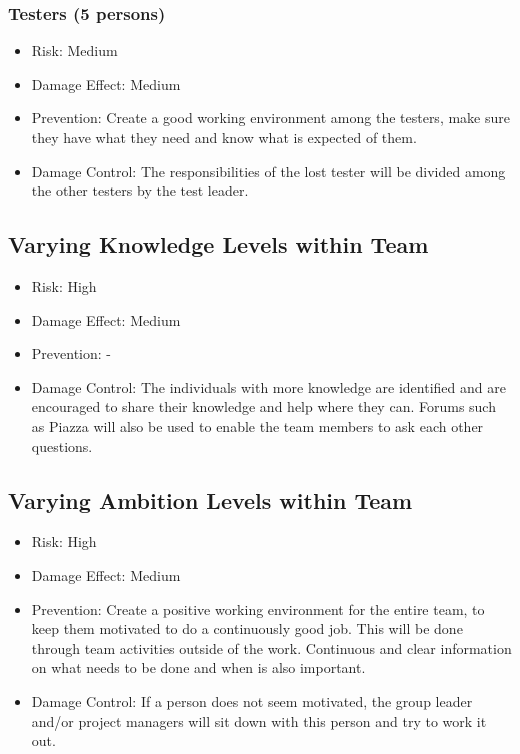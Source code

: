\documentclass[a4paper]{article}
\begin{document}
\subsubsection{Testers (5 persons)}
\begin{itemize}
\item Risk: Medium
\item Damage Effect: Medium
\item Prevention: Create a good working environment among the testers, make sure they have what they need and know what is expected of them.
\item Damage Control: The responsibilities of the lost tester will be divided among the other testers by the test leader.
\end{itemize}

\subsection{Varying Knowledge Levels within Team}
\begin{itemize}
\item Risk: High
\item Damage Effect: Medium
\item Prevention: -
\item Damage Control: The individuals with more knowledge are identified and are encouraged to share their knowledge and help where they can. Forums such as Piazza will also be used to enable the team members to ask each other questions. 
\end{itemize}

\subsection{Varying Ambition Levels within Team}
\begin{itemize}
\item Risk: High
\item Damage Effect: Medium
\item Prevention: Create a positive working environment for the entire team, to keep them motivated to do a continuously good job. This will be done through team activities outside of the work. Continuous and clear information on what needs to be done and when is also important.
\item Damage Control: If a person does not seem motivated, the group leader and/or project managers will sit down with this person and try to work it out.
\end{itemize}
\end{document}
